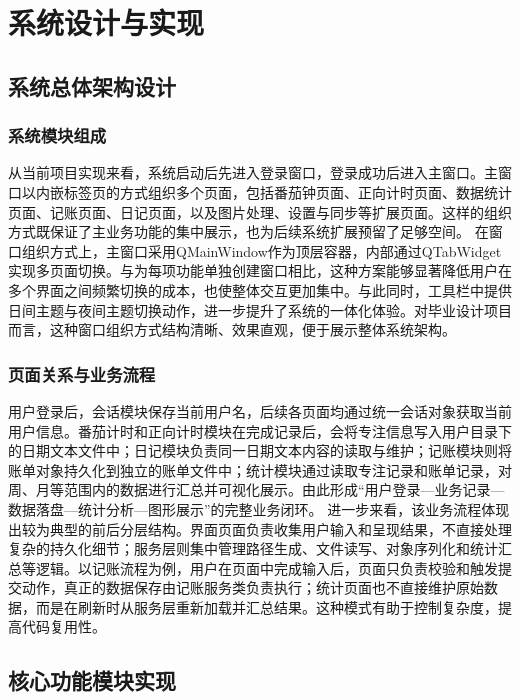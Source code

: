 \chapter{系统设计与实现}

\section{系统总体架构设计}

\subsection{系统模块组成}
从当前项目实现来看，系统启动后先进入登录窗口，登录成功后进入主窗口。主窗口以内嵌标签页的方式组织多个页面，包括番茄钟页面、正向计时页面、数据统计页面、记账页面、日记页面，以及图片处理、设置与同步等扩展页面。这样的组织方式既保证了主业务功能的集中展示，也为后续系统扩展预留了足够空间。
在窗口组织方式上，主窗口采用QMainWindow作为顶层容器，内部通过QTabWidget实现多页面切换。与为每项功能单独创建窗口相比，这种方案能够显著降低用户在多个界面之间频繁切换的成本，也使整体交互更加集中。与此同时，工具栏中提供日间主题与夜间主题切换动作，进一步提升了系统的一体化体验。对毕业设计项目而言，这种窗口组织方式结构清晰、效果直观，便于展示整体系统架构。

\subsection{页面关系与业务流程}
用户登录后，会话模块保存当前用户名，后续各页面均通过统一会话对象获取当前用户信息。番茄计时和正向计时模块在完成记录后，会将专注信息写入用户目录下的日期文本文件中；日记模块负责同一日期文本内容的读取与维护；记账模块则将账单对象持久化到独立的账单文件中；统计模块通过读取专注记录和账单记录，对周、月等范围内的数据进行汇总并可视化展示。由此形成“用户登录—业务记录—数据落盘—统计分析—图形展示”的完整业务闭环。
进一步来看，该业务流程体现出较为典型的前后分层结构。界面页面负责收集用户输入和呈现结果，不直接处理复杂的持久化细节；服务层则集中管理路径生成、文件读写、对象序列化和统计汇总等逻辑。以记账流程为例，用户在页面中完成输入后，页面只负责校验和触发提交动作，真正的数据保存由记账服务类负责执行；统计页面也不直接维护原始数据，而是在刷新时从服务层重新加载并汇总结果。这种模式有助于控制复杂度，提高代码复用性。

\section{核心功能模块实现}

